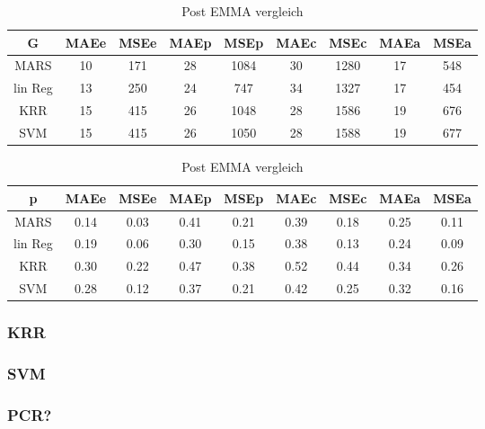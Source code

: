 \begin{table}[htb]
	\centering
    \caption{Post EMMA vergleich}
	\label{tab:post-emma}
	\begin{tabular}{c cc cc cc cc}
    \hline\hline
    G&  MAEe&   MSEe&   MAEp&   MSEp&   MAEc&   MSEc&   MAEa& MSEa \\
    \hline
        MARS&   10& 171&    28& 1084&   30& 1280&   17& 548\\
        lin Reg&    13& 250&    24& 747&    34& 1327&   17& 454\\
        KRR& 15& 415&    26& 1048&   28& 1586&   19& 676\\
        SVM& 15&  415&    26& 1050&   28& 1588&   19& 677\\
    \hline\hline
	\end{tabular}
	\begin{tabular}{c cc cc cc cc}
    \hline\hline
    p&  MAEe&   MSEe&   MAEp&   MSEp&   MAEc&   MSEc&   MAEa& MSEa \\
    \hline
        MARS&   0.14&   0.03&   0.41&   0.21&   0.39&   0.18&   0.25&   0.11\\
        lin Reg&    0.19&   0.06&   0.30&   0.15&   0.38&   0.13&   0.24&   0.09\\
        KRR& 0.30&   0.22&   0.47&   0.38&   0.52&   0.44&   0.34&   0.26\\
        SVM& 0.28&   0.12&   0.37&   0.21&   0.42&   0.25&   0.32&   0.16\\
    \hline\hline
	\end{tabular}
\end{table}
    

\subsubsection{KRR}

\subsubsection{SVM}



\iffalse
\subsubsection{PCR?}
